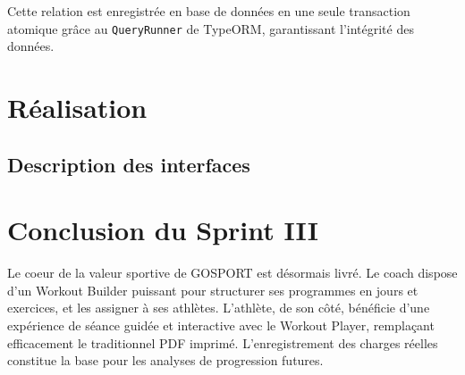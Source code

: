 Cette relation est enregistrée en base de données en une seule transaction atomique grâce au \texttt{QueryRunner} de TypeORM, garantissant l'intégrité des données.

\section{Réalisation}

\subsection{Description des interfaces}

\section*{Conclusion du Sprint III}
\mtcaddsection
{}
Le coeur de la valeur sportive de GOSPORT est désormais livré. Le coach dispose d'un Workout Builder puissant pour structurer ses programmes en jours et exercices, et les assigner à ses athlètes. L'athlète, de son côté, bénéficie d'une expérience de séance guidée et interactive avec le Workout Player, remplaçant efficacement le traditionnel PDF imprimé. L'enregistrement des charges réelles constitue la base pour les analyses de progression futures.
